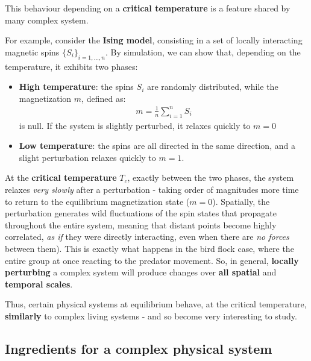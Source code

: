 \documentclass[../template.tex]{subfiles}
\begin{document}
\medskip

This behaviour depending on a \textbf{critical temperature} is a feature shared by many complex system.

For example, consider the \textbf{Ising model}, consisting in a set of locally interacting magnetic spins $\{S_i\}_{i=1,\dots,n}$. By simulation, we can show that, depending on the temperature, it exhibits two phases:
\begin{itemize}
    \item \textbf{High temperature}: the spins $S_i$ are randomly distributed, while the magnetization $m$, defined as:
    \begin{align*}
        m = \frac{1}{n} \sum_{i=1}^n S_i    
    \end{align*}
    is null. If the system is slightly perturbed, it relaxes quickly to $m=0$
    \item \textbf{Low temperature}: the spins are all directed in the same direction, and a slight perturbation relaxes quickly to $m=1$.  
\end{itemize}
At the \textbf{critical temperature} $T_c$, exactly between the two phases, the system relaxes \textit{very slowly} after a perturbation - taking order of magnitudes more time to return to the equilibrium magnetization state ($m=0$). Spatially, the perturbation generates wild fluctuations of the spin states that propagate throughout the entire system, meaning that distant points become highly correlated, \textit{as if} they were directly interacting, even when there are \textit{no forces} between them). This is exactly what happens in the bird flock case, where the entire group  at once reacting to the predator movement.
So, in general, \textbf{locally perturbing} a complex system will produce changes over \textbf{all spatial} and \textbf{temporal scales}. 

\medskip

Thus, certain physical systems at equilibrium behave, at the critical temperature, \textbf{similarly}  to complex living systems - and so become very interesting to study. 

\subsection{Ingredients for a complex physical system}
\end{document}
